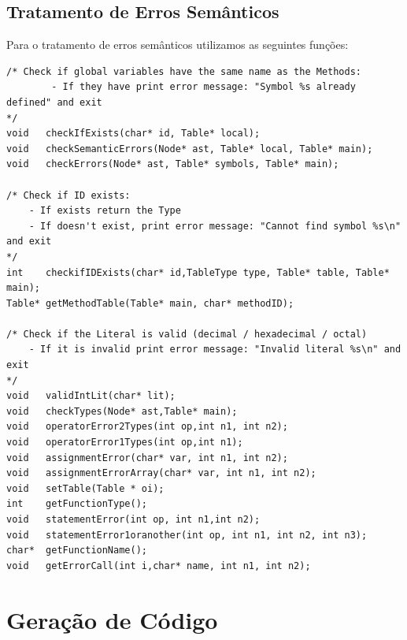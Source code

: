 \documentclass[12pt]{article}
\begin{document}
\pagebreak
\subsection{Tratamento de Erros Semânticos}
Para o tratamento de erros semânticos utilizamos as seguintes funções:
\begin{lstlisting}
/* Check if global variables have the same name as the Methods:
		- If they have print error message: "Symbol %s already defined" and exit 
*/
void   checkIfExists(char* id, Table* local);
void   checkSemanticErrors(Node* ast, Table* local, Table* main);
void   checkErrors(Node* ast, Table* symbols, Table* main);

/* Check if ID exists:
	- If exists return the Type 
	- If doesn't exist, print error message: "Cannot find symbol %s\n" and exit 
*/
int    checkifIDExists(char* id,TableType type, Table* table, Table* main);
Table* getMethodTable(Table* main, char* methodID);

/* Check if the Literal is valid (decimal / hexadecimal / octal)
	- If it is invalid print error message: "Invalid literal %s\n" and exit
*/
void   validIntLit(char* lit);
void   checkTypes(Node* ast,Table* main);
void   operatorError2Types(int op,int n1, int n2);
void   operatorError1Types(int op,int n1);
void   assignmentError(char* var, int n1, int n2);
void   assignmentErrorArray(char* var, int n1, int n2);
void   setTable(Table * oi);
int    getFunctionType();
void   statementError(int op, int n1,int n2);
void   statementError1oranother(int op, int n1, int n2, int n3);
char*  getFunctionName();
void   getErrorCall(int i,char* name, int n1, int n2);

\end{lstlisting}

\section{Geração de Código}
	
\end{document}
